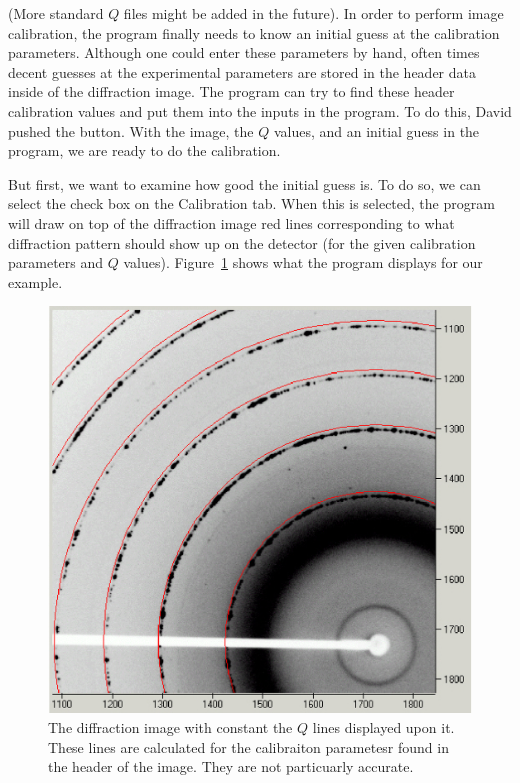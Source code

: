 (More standard $Q$ files might be added in the future).
In order to perform
image calibration, the program finally needs to know an 
initial guess at the calibration parameters. Although one
could enter these parameters by hand, often times decent
guesses at the experimental parameters are stored in the 
header data inside of the diffraction image. The program
can try to find these header calibration values and put
them into the inputs in the program. To do this, David
pushed the  button. With the image,
the $Q$ values, and an initial guess in the program,
we are ready to do the calibration. 

But first, we want to examine how good the initial guess 
is. To do so, we can select the 
check box on the Calibration tab. When this is selected, 
the program will draw
on top of the diffraction image red lines corresponding
to what diffraction pattern should show up on the
detector (for the given calibration parameters and $Q$
values). Figure~\ref{bad_calibration_diffraction_image}
shows what the program displays for our example.

\begin{figure}[h]
    \centering
    \includegraphics[scale=.75]{figures/bad_calibration_diffraction_image.eps}
    \caption{The diffraction image with constant the $Q$
    lines displayed upon it. These lines are calculated
    for the calibraiton parametesr found in the
    header of the image. They are not particuarly
    accurate.}
    \label{bad_calibration_diffraction_image}
\end{figure}

